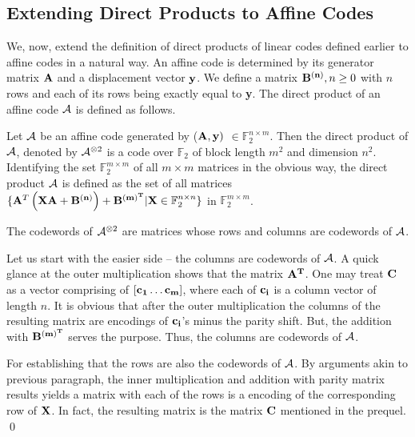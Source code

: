 {\subsection{Extending Direct Products to Affine Codes}
We, now, extend the definition of direct products of linear codes
defined earlier to affine codes in a natural way. An affine code is
determined by its generator matrix ${\bf A}$ and a displacement vector
${\bf y}$. We define a matrix ${\bf B^{(n)}}, n \ge 0$ with $n$ rows
and each of its rows being exactly equal to {\bf y}. The direct
product of an affine code ${\cal A}$ is defined as follows.

 \begin{definition}
   Let ${\cal A}$ be an affine code generated by (${\bf A, y})$ $\in
   \mathbb{F}_2^{n \times m}$.  Then the direct product of ${\cal A}$,
   denoted by ${\cal A}^{\otimes 2}$ is a code over $\mathbb{F}_2$ of block
   length $m^2$ and dimension $n^2$. Identifying the set
   $\mathbb{F}_2^{m \times m}$ of all $m \times m$ matrices in the
   obvious way, the direct product ${\cal A}$ is defined as the set of all
   matrices $\{ {\bf A}^T \left({\bf X A + B^{(n)} } \right) + {\bf
     B^{(m)^{T}}} | {\bf X} \in \mathbb{F}_2^{n \times n} \}$ in
   $\mathbb{F}_2^{m \times m}$.
 \end{definition}

 \begin{claim}
   The codewords of ${\cal A} ^{\otimes 2}$ are matrices whose rows and
   columns are codewords of ${\cal A}$.
 \end{claim} 
    Let us start with
 the easier side -- the columns are codewords of ${\cal A}$. A quick glance
 at the outer multiplication shows that the matrix ${\bf A^{T}}$. One
 may treat ${\bf C}$ as a vector comprising of $[{\bf c_1 \ldots
   c_m}]$, where each of ${\bf c_i}$ is a column vector of length
 $n$. It is obvious that after the outer multiplication the columns of
 the resulting matrix are encodings of ${\bf c_i}$'s minus the parity
 shift. But, the addition with ${\bf B^{(m)^{T}}}$ serves the
 purpose. Thus, the columns are codewords of ${\cal A}$.

 For establishing that the rows are also the codewords of ${\cal A}$. By
 arguments akin to previous paragraph, the inner multiplication and
 addition with parity matrix results yields a matrix with each of the
 rows is a encoding of the corresponding row of ${\bf X}$. In fact,
 the resulting matrix is the matrix ${\bf C}$ mentioned in the
 prequel. \qed



}
